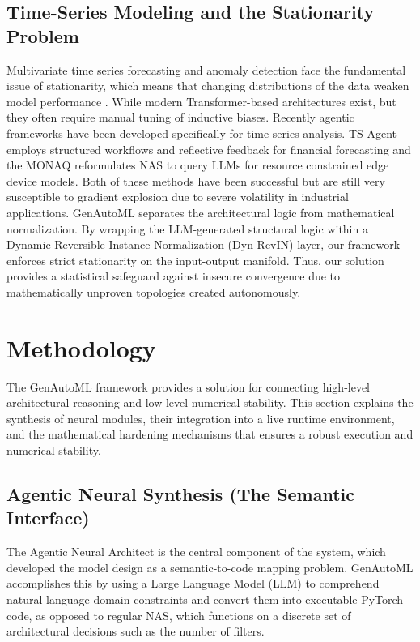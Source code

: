 \documentclass{article}
\begin{document}
\subsection{Time-Series Modeling and the Stationarity Problem}
Multivariate time series forecasting and anomaly detection face the fundamental issue of stationarity, which means that changing distributions of the data weaken model performance \cite{liu2022non}. While modern Transformer-based architectures \cite{wu2021autoformer, zeng2022are} exist,  but they often require manual tuning of inductive biases. Recently agentic frameworks have been developed specifically for time series analysis. TS-Agent \cite{ts_agent} employs structured workflows and reflective feedback for financial forecasting and the MONAQ \cite{monaq} reformulates NAS to query LLMs for resource constrained edge device models. Both of these methods have been successful but are still very susceptible to gradient explosion due to severe volatility in industrial applications. GenAutoML separates the architectural logic from mathematical normalization. By wrapping the LLM-generated structural logic within a Dynamic Reversible Instance Normalization (Dyn-RevIN) \cite{kim2022reversible} layer, our framework enforces strict stationarity on the input-output manifold. Thus, our solution provides a statistical safeguard against insecure convergence due to mathematically unproven topologies created autonomously.

\section{Methodology}
\label{method}
The GenAutoML framework provides a solution for connecting high-level architectural reasoning and low-level numerical stability. This section explains the synthesis of neural modules, their integration into a live runtime environment, and the mathematical hardening mechanisms that ensures a robust execution and numerical stability.

\subsection{Agentic Neural Synthesis (The Semantic Interface)}
The Agentic Neural Architect is the central component of the system, which developed the model design as a semantic-to-code mapping problem. GenAutoML accomplishes this by using a Large Language Model (LLM) to comprehend natural language domain constraints and convert them into executable PyTorch code, as opposed to regular NAS, which functions on a discrete set of architectural decisions such as the number of filters.
\end{document}
